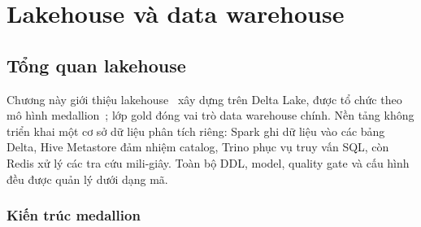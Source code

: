 \chapter{Lakehouse và data warehouse}
\label{chap:lakehouse}

\section{Tổng quan lakehouse}

Chương này giới thiệu lakehouse~\cite{armbrust2021lakehouse} xây dựng trên Delta Lake, được tổ chức theo mô hình medallion~\cite{databricksMedallion}; lớp gold đóng vai trò data warehouse chính. Nền tảng không triển khai một cơ sở dữ liệu phân tích riêng: Spark ghi dữ liệu vào các bảng Delta, Hive Metastore đảm nhiệm catalog, Trino phục vụ truy vấn SQL, còn Redis xử lý các tra cứu mili-giây. Toàn bộ DDL, model, quality gate và cấu hình đều được quản lý dưới dạng mã.

\subsection{Kiến trúc medallion}


